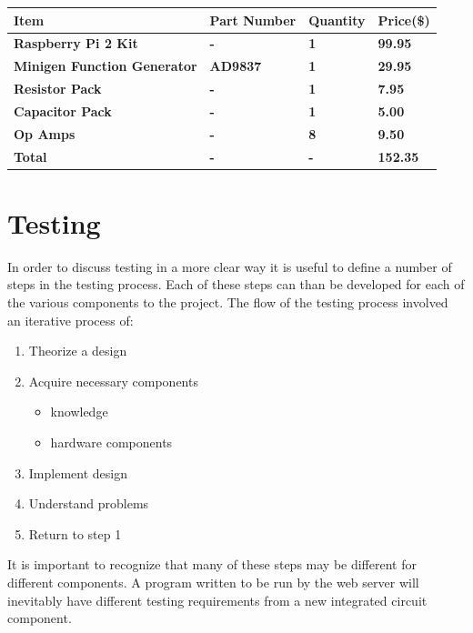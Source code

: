 \documentclass{article}	%
\begin{document}
\begin{multicols}{2}
\begin{center}
\begin{tabularx}{0.4\textwidth}{|X|X|X|X|}
        \textbf{Item} &
        \textbf{Part Number} &
        \textbf{Quantity} &
        \textbf{Price(\$)} \\
        \hline

        \textbf{Raspberry Pi 2 Kit} &
        \textbf{-} &
        \textbf{1} &
        \textbf{99.95} \\
        \hline

        \textbf{Minigen Function Generator} &
        \textbf{AD9837} &
        \textbf{1} &
        \textbf{29.95} \\
        \hline

        \textbf{Resistor Pack} &
        \textbf{-} &
        \textbf{1} &
        \textbf{7.95} \\
        \hline

        \textbf{Capacitor Pack} &
        \textbf{-} &
        \textbf{1} &
        \textbf{5.00} \\
        \hline

        \textbf{Op Amps} &
        \textbf{-} &
        \textbf{8} &
        \textbf{9.50} \\
        \hline

        \textbf{Total} &
        \textbf{-} &
        \textbf{-} &
        \textbf{152.35} \\

        \hline
    \end{tabularx}
\end{center}

\section{Testing}
In order to discuss testing in a more clear way
it is useful to define a number of steps
in the testing process.
Each of these steps can than be developed for
each of the various components to the project.
%
The flow of the testing process
involved an iterative process of:
\begin{enumerate}
\item Theorize a design
\item Acquire necessary components
    \begin{itemize}
    \item knowledge
    \item hardware components
    \end{itemize}
\item Implement design
\item Understand problems
\item Return to step 1
\end{enumerate}
%
It is important to recognize that many
of these steps may be different for different components.
A program written to be run by the web server
will inevitably have different testing requirements from
a new integrated circuit component.


\end{multicols}
\end{document}

